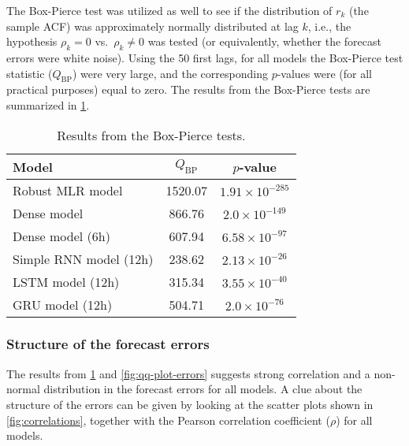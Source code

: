 \noindent
The Box-Pierce test was utilized as well to see if the distribution of $r_k$ (the sample ACF) was approximately normally distributed at lag $k$, i.e., the hypothesis $\rho_k = 0$ vs.\ $\rho_k \neq 0$ was tested (or equivalently, whether the forecast errors were white noise). Using the 50 first lags, for all models the Box-Pierce test statistic ($Q_{\text{BP}}$) were very large, and the corresponding $p$-values were (for all practical purposes) equal to zero. The results from the Box-Pierce tests are summarized in \cref{tab:boxpierce}.
\begin{table}[h]
\centering
\caption{Results from the Box-Pierce tests.}
\label{tab:boxpierce}
\begin{tabular}{@{}lcc@{}}
\toprule
Model                  & $Q_{\text{BP}}$ & $p$-value             \\ \midrule
Robust MLR model       & 1520.07         & $1.91\times10^{-285}$ \\
Dense model            & 866.76          & $2.0\times10^{-149}$  \\
Dense model (6h)       & 607.94          & $6.58\times10^{-97}$  \\
Simple RNN model (12h) & 238.62          & $2.13\times10^{-26}$  \\
LSTM model (12h)       & 315.34          & $3.55\times10^{-40}$  \\
GRU model (12h)        & 504.71          & $2.0\times10^{-76}$   \\ \bottomrule
\end{tabular}
\end{table}

\subsubsection{Structure of the forecast errors}
The results from \cref{tab:boxpierce} and \cref{fig:qq-plot-errors} suggests strong correlation and a non-normal distribution in the forecast errors for all models. A clue about the structure of the errors can be given by looking at the scatter plots shown in \cref{fig:correlations}, together with the Pearson correlation coefficient ($\rho$) for all models.



